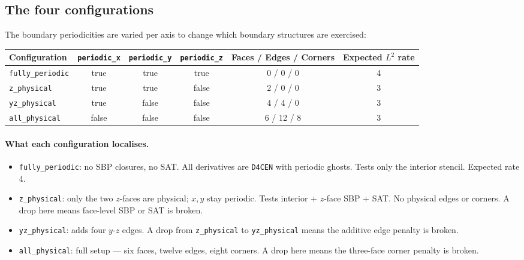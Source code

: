 \documentclass[11pt]{article}
\begin{document}
\subsection{The four configurations}

The boundary periodicities are varied per axis to change which
boundary structures are exercised:

\begin{center}
\small
\begin{tabular}{lccccc}
\toprule
Configuration       & \texttt{periodic\_x} & \texttt{periodic\_y} & \texttt{periodic\_z}
                    & Faces / Edges / Corners & Expected $L^2$ rate \\
\midrule
\texttt{fully\_periodic} & true  & true  & true  & 0 / 0 / 0   & 4 \\
\texttt{z\_physical}     & true  & true  & false & 2 / 0 / 0   & 3 \\
\texttt{yz\_physical}    & true  & false & false & 4 / 4 / 0   & 3 \\
\texttt{all\_physical}   & false & false & false & 6 / 12 / 8  & 3 \\
\bottomrule
\end{tabular}
\end{center}

\paragraph{What each configuration localises.}
\begin{itemize}[itemsep=2pt,topsep=2pt]
  \item \texttt{fully\_periodic}: no SBP closures, no SAT.  All
        derivatives are \texttt{D4CEN} with periodic ghosts.
        Tests only the interior stencil.  Expected rate 4.
  \item \texttt{z\_physical}: only the two $z$-faces are physical;
        $x, y$ stay periodic.  Tests interior + $z$-face SBP +
        SAT.  No physical edges or corners.  A drop here means
        face-level SBP or SAT is broken.
  \item \texttt{yz\_physical}: adds four $y$-$z$ edges.  A drop
        from \texttt{z\_physical} to \texttt{yz\_physical} means
        the additive edge penalty is broken.
  \item \texttt{all\_physical}: full setup --- six faces, twelve
        edges, eight corners.  A drop here means the three-face
        corner penalty is broken.
\end{itemize}
\end{document}
